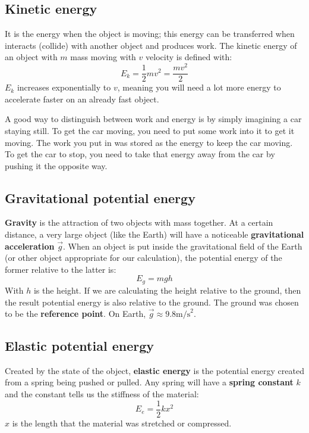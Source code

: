 \subsection{Kinetic energy}
It is the energy when the object is moving; this energy can be transferred when interacts (collide) with another object and produces work. The kinetic energy of an object with $m$ mass moving with $v$ velocity is defined with:
\begin{equation}
    E_k 
    = \frac{1}{2}mv^2
    = \frac{mv^2}{2}    
\end{equation}
$E_k$ increases exponentially to $v$, meaning you will need a lot more energy to accelerate faster on an already fast object.

A good way to distinguish between work and energy is by simply imagining a car staying still. To get the car moving, you need to put some work into it to get it moving. The work you put in was stored as the energy to keep the car moving. To get the car to stop, you need to take that energy away from the car by pushing it the opposite way.

\subsection{Gravitational potential energy}
\textbf{Gravity} is the attraction of two objects with mass together. At a certain distance, a very large object (like the Earth) will have a noticeable \textbf{gravitational acceleration} $\vec{g}$. When an object is put inside the gravitational field of the Earth (or other object appropriate for our calculation), the potential energy of the former relative to the latter is:
\begin{equation} E_g = mgh \end{equation}
With $h$ is the height. If we are calculating the height relative to the ground, then the result potential energy is also relative to the ground. The ground was chosen to be the \textbf{reference point}. On Earth, $\vec{g}\approx9.8\text{m/s}^2$.

\subsection{Elastic potential energy}
Created by the state of the object, \textbf{elastic energy} is the potential energy created from a spring being pushed or pulled. Any spring will have a \textbf{spring constant} $k$ and the constant tells us the stiffness of the material:
\begin{equation}
    E_e = \frac{1}{2}kx^2
\end{equation}
$x$ is the length that the material was stretched or compressed.

